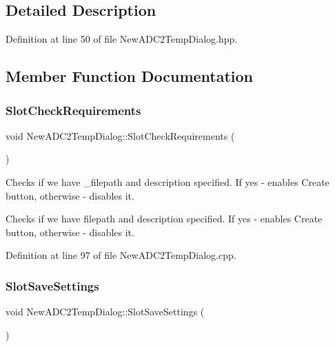 \subsection{Detailed Description}


Definition at line 50 of file New\+A\+D\+C2\+Temp\+Dialog.\+hpp.



\subsection{Member Function Documentation}
\mbox{\label{class_new_a_d_c2_temp_dialog_afe68e82283f8cf518d6df9fafcea2a43}} 
\subsubsection{\texorpdfstring{Slot\+Check\+Requirements}{SlotCheckRequirements}}
{\footnotesize\ttfamily void New\+A\+D\+C2\+Temp\+Dialog\+::\+Slot\+Check\+Requirements (\begin{DoxyParamCaption}{ }\end{DoxyParamCaption})\hspace{0.3cm}{\ttfamily [slot]}}



Checks if we have \+\_\+filepath and description specified. If yes -\/ enables Create button, otherwise -\/ disables it. 

Checks if we have filepath and description specified. If yes -\/ enables Create button, otherwise -\/ disables it. 

Definition at line 97 of file New\+A\+D\+C2\+Temp\+Dialog.\+cpp.

\mbox{\label{class_new_a_d_c2_temp_dialog_a59b42efcbe03d9429250558eebaf6dd3}} 
\subsubsection{\texorpdfstring{Slot\+Save\+Settings}{SlotSaveSettings}}
{\footnotesize\ttfamily void New\+A\+D\+C2\+Temp\+Dialog\+::\+Slot\+Save\+Settings (\begin{DoxyParamCaption}{ }\end{DoxyParamCaption})\hspace{0.3cm}{\ttfamily [slot]}}



